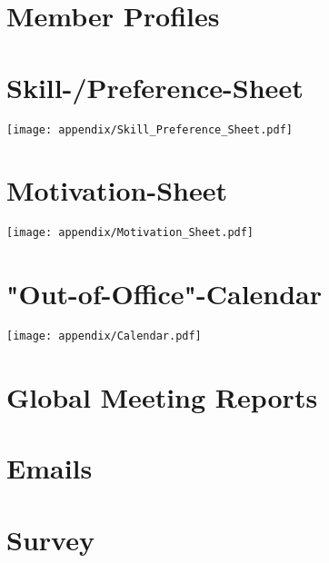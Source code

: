 \section{Member Profiles} \label{sec:member_profiles}








\section{Skill-/Preference-Sheet} \label{sec:Skill_Preference_Sheet}
\texttt{[image: appendix/Skill\_Preference\_Sheet.pdf]}

\section{Motivation-Sheet} \label{sec:Motivation_Sheet}
\texttt{[image: appendix/Motivation\_Sheet.pdf]}

\section{"Out-of-Office"-Calendar} \label{sec:calendar}
\texttt{[image: appendix/Calendar.pdf]}

\section{Global Meeting Reports}








\section{Emails}

\section{Survey}